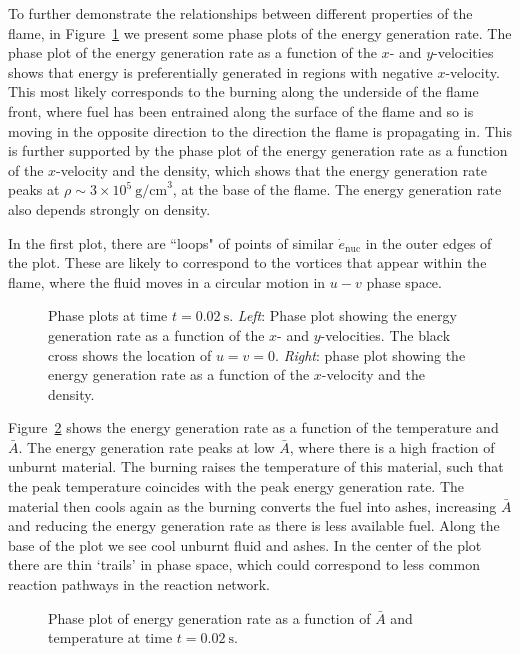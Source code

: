 \documentclass[preprint,times,tighten]{aastex63}
\begin{document}
To further demonstrate the relationships between different properties
of the flame, in Figure~\ref{fig:phase_plots} we present some phase
plots of the energy generation rate. The phase plot of the energy
generation rate as a function of the $x$- and $y$-velocities shows
that energy is preferentially generated in regions with negative
$x$-velocity. This most likely corresponds to the burning along the
underside of the flame front, where fuel has been entrained along the
surface of the flame and so is moving in the opposite direction to the
direction the flame is propagating in. This is further supported by
the phase plot of the energy generation rate as a function of the
$x$-velocity and the density, which shows that the energy generation
rate peaks at $\rho \sim 3 \times 10^5~\mathrm{g/cm}^3$, at the base
of the flame.  The energy generation rate also depends strongly on density.

In the first plot, there are ``loops" of
points of similar $\dot{e}_\mathrm{nuc}$ in the outer edges of the plot.
These are likely to correspond to the vortices that appear within the flame,
where the fluid moves in a circular motion in $u-v$ phase space.

\begin{figure}[t]
\centering
{}
\caption{\label{fig:phase_plots} Phase plots at time $t = 0.02~\mathrm{s}$.
\emph{Left}: Phase plot showing the energy generation rate as a function of
the $x$- and $y$-velocities. The black cross shows the location of $u = v = 0$. \emph{Right}: phase plot showing the energy
generation rate as a function of the $x$-velocity and the density.}
\end{figure}

Figure~\ref{fig:abar_temp} shows the energy generation rate as a function of the
temperature and $\bar{A}$. 
The energy generation rate peaks at low $\bar{A}$, where there is a high fraction
of unburnt material. The burning raises the temperature of this material, such
that the peak temperature coincides with the peak energy generation rate. The
material then cools again as the burning converts the fuel into ashes,
increasing $\bar{A}$ and reducing the energy generation rate as there is
less available fuel. Along the base of the plot we see cool unburnt fluid and
ashes. In the center of the plot there are thin `trails' in phase space, which
could correspond to less common reaction pathways in the reaction network.

\begin{figure}[t]
\centering
{}
\caption{\label{fig:abar_temp} Phase plot of energy generation rate as a function of $\bar{A}$ and temperature at time $t = 0.02~\mathrm{s}$.}
\end{figure}
\end{document}
